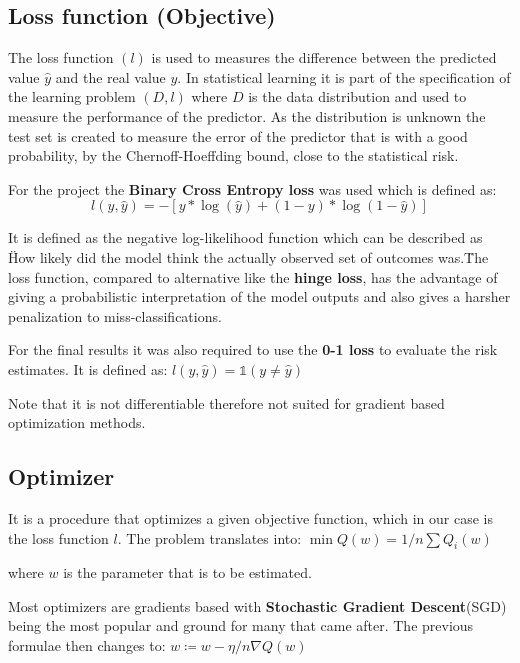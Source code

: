\subsection{Loss function (Objective)}
\label{subsec:loss-function-(objective)}
The loss function $(l)$ is used to measures the difference between the predicted value $\hat{y}$ and the real value $y$.
In statistical learning it is part of the specification of the learning problem $(D,l)$ where $D$ is the data distribution and used
to measure the performance of the predictor. As the distribution is unknown the test set is created to measure the error
of the predictor that is with a good probability, by the Chernoff-Hoeffding bound, close to the statistical risk.

For the project the \textbf{Binary Cross Entropy loss} was used which is defined as:
\[l(y, \hat{y}) = - [y*\log(\hat{y}) + (1 - y) * \log(1 - \hat{y})]\]

It is defined as the negative log-likelihood function which can be described as
\"How likely did the model think the actually observed set of outcomes was.\"


The loss function, compared to alternative like the \textbf{hinge loss}, has the advantage of giving a probabilistic
interpretation of the model outputs and also gives a harsher penalization to miss-classifications.

For the final results it was also required to use the \textbf{0-1 loss} to evaluate the risk estimates. It is defined as:
$l(y,\hat{y}) = \mathds{1}(y \neq \hat{y})$

Note that it is not differentiable therefore not suited for gradient based optimization methods.

\subsection{Optimizer}
\label{subsec:optimizer}
It is a procedure that optimizes a given objective function, which in our case is the loss function $l$.
The problem translates into:
$\min Q(w) = 1/n \sum Q_i(w)$

where $w$ is the parameter that is to be estimated.

Most optimizers are gradients based with \textbf{Stochastic Gradient Descent}(SGD) being the most popular and ground for many that came after.
The previous formulae then changes to:
$w \coloneqq w - \eta /n \nabla Q(w) $

